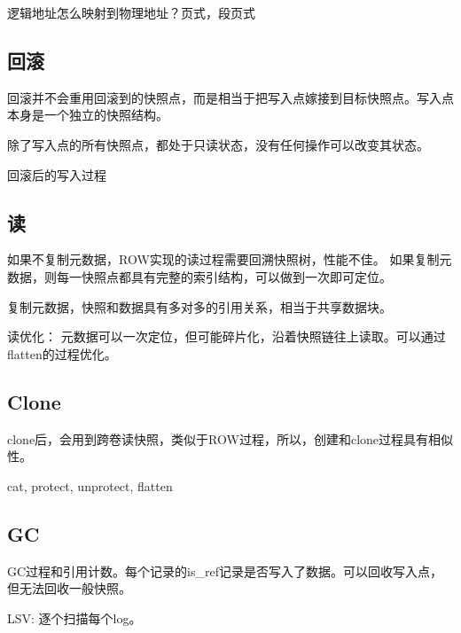 逻辑地址怎么映射到物理地址？页式，段页式

\subsection{回滚}

回滚并不会重用回滚到的快照点，而是相当于把写入点嫁接到目标快照点。写入点本身是一个独立的快照结构。

除了写入点的所有快照点，都处于只读状态，没有任何操作可以改变其状态。

回滚后的写入过程

\subsection{读}

如果不复制元数据，ROW实现的读过程需要回溯快照树，性能不佳。
如果复制元数据，则每一快照点都具有完整的索引结构，可以做到一次即可定位。

复制元数据，快照和数据具有多对多的引用关系，相当于共享数据块。

读优化： 元数据可以一次定位，但可能碎片化，沿着快照链往上读取。可以通过flatten的过程优化。

\subsection{Clone}

clone后，会用到跨卷读快照，类似于ROW过程，所以，创建和clone过程具有相似性。

cat, protect, unprotect, flatten

\subsection{GC}

GC过程和引用计数。每个记录的is\_ref记录是否写入了数据。可以回收写入点，但无法回收一般快照。

LSV: 逐个扫描每个log。
